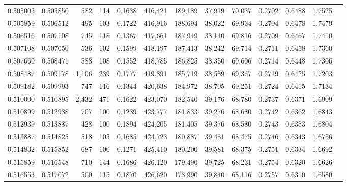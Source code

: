 \begin{tabular}{rrrrrrrrrrrrr}
0.505003 & 0.505850 &   582 & 114 &                                     0.1638 & 416,421 & 189,189 &  37,919 &  70,037 & 0.2702 & 0.6488 & 1.7525 \\
0.505859 & 0.506512 &   495 & 103 &                                     0.1722 & 416,916 & 188,694 &  38,022 &  69,934 & 0.2704 & 0.6478 & 1.7479 \\
0.506516 & 0.507108 &   745 & 118 &                                     0.1367 & 417,661 & 187,949 &  38,140 &  69,816 & 0.2709 & 0.6467 & 1.7410 \\
0.507108 & 0.507650 &   536 & 102 &                                     0.1599 & 418,197 & 187,413 &  38,242 &  69,714 & 0.2711 & 0.6458 & 1.7360 \\
0.507669 & 0.508471 &   588 & 108 &                                     0.1552 & 418,785 & 186,825 &  38,350 &  69,606 & 0.2714 & 0.6448 & 1.7306 \\
0.508487 & 0.509178 & 1,106 & 239 &                                     0.1777 & 419,891 & 185,719 &  38,589 &  69,367 & 0.2719 & 0.6425 & 1.7203 \\
0.509182 & 0.509993 &   747 & 116 &                                     0.1344 & 420,638 & 184,972 &  38,705 &  69,251 & 0.2724 & 0.6415 & 1.7134 \\
0.510000 & 0.510895 & 2,432 & 471 &                                     0.1622 & 423,070 & 182,540 &  39,176 &  68,780 & 0.2737 & 0.6371 & 1.6909 \\
0.510899 & 0.512938 &   707 & 100 &                                     0.1239 & 423,777 & 181,833 &  39,276 &  68,680 & 0.2742 & 0.6362 & 1.6843 \\
0.512939 & 0.513887 &   428 & 100 &                                     0.1894 & 424,205 & 181,405 &  39,376 &  68,580 & 0.2743 & 0.6353 & 1.6804 \\
0.513887 & 0.514825 &   518 & 105 &                                     0.1685 & 424,723 & 180,887 &  39,481 &  68,475 & 0.2746 & 0.6343 & 1.6756 \\
0.514832 & 0.515852 &   687 & 100 &                                     0.1271 & 425,410 & 180,200 &  39,581 &  68,375 & 0.2751 & 0.6334 & 1.6692 \\
0.515859 & 0.516548 &   710 & 144 &                                     0.1686 & 426,120 & 179,490 &  39,725 &  68,231 & 0.2754 & 0.6320 & 1.6626 \\
0.516553 & 0.517072 &   500 & 115 &                                     0.1870 & 426,620 & 178,990 &  39,840 &  68,116 & 0.2757 & 0.6310 & 1.6580 \\

\end{tabular}

